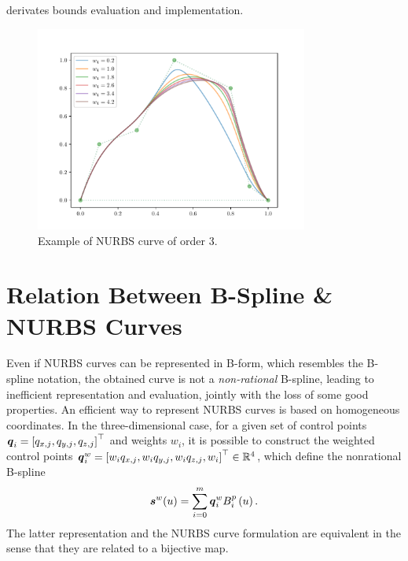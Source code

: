 derivates bounds evaluation and implementation.
\begin{figure}[t]
	\centering
	\includegraphics[width=0.8\textwidth]{Figs/AppendixA/nurbs_example.pdf}
	\caption{Example of NURBS curve of order $3$.}%
    \label{FIG:NURBS-CURVE}
\end{figure}

\section{Relation Between B-Spline \& NURBS Curves}
Even if NURBS curves can be represented in B-form, which resembles the B-spline notation, the obtained curve is not a \emph{non-rational}
B-spline, leading to inefficient representation and evaluation, jointly with the loss of some good properties.
An efficient way to represent NURBS curves is based on homogeneous coordinates.
In the three-dimensional case, for a given set of control points $\boldsymbol{q}_i = \left[ q_{x,j}, q_{y,j}, q_{z,j} \right]^{\top}$
and weights $w_i$, it is possible to construct the weighted control points
$\boldsymbol{q}^w_i = \left[ w_iq_{x,j}, w_iq_{y,j}, w_iq_{z,j}, w_i \right]^{\top} \in \mathbb{R}^{4}$, which define the nonrational B-spline
\begin{equation*}
    \boldsymbol{s}^w(u) = \sum_{i=0}^{m} \boldsymbol{q}^w_i B_i^{p} \left( u \right).
\end{equation*}
The latter representation and the NURBS curve formulation are equivalent in the sense that they are related to a bijective map.


